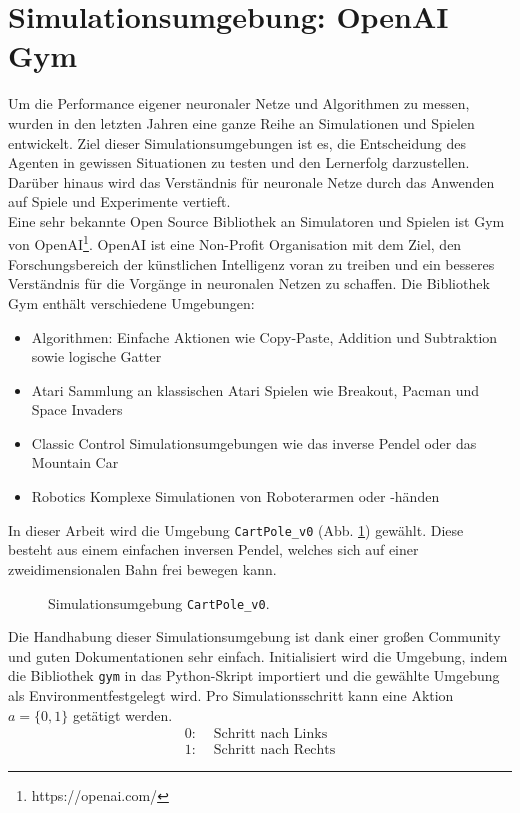 \section{Simulationsumgebung: OpenAI Gym}
\label{sec:imp_sim}
	Um die Performance eigener neuronaler Netze und Algorithmen zu messen, wurden in den letzten Jahren eine ganze Reihe an Simulationen und Spielen entwickelt. Ziel dieser Simulationsumgebungen ist es, die Entscheidung des Agenten in gewissen Situationen zu testen und den Lernerfolg darzustellen. Darüber hinaus wird das Verständnis für neuronale Netze durch das Anwenden auf Spiele und Experimente vertieft.\\
	Eine sehr bekannte Open Source Bibliothek an Simulatoren und Spielen ist Gym von OpenAI\footnote{https://openai.com/}. OpenAI ist eine Non-Profit Organisation mit dem Ziel, den Forschungsbereich der künstlichen Intelligenz voran zu treiben und ein besseres Verständnis für die Vorgänge in neuronalen Netzen zu schaffen. Die Bibliothek Gym enthält verschiedene Umgebungen:
	\begin{itemize}
		\item Algorithmen:
		\subitem Einfache Aktionen wie Copy-Paste, Addition und Subtraktion sowie logische Gatter
		\item Atari
		\subitem Sammlung an klassischen Atari Spielen wie Breakout, Pacman und Space Invaders
		\item Classic Control
		\subitem Simulationsumgebungen wie das inverse Pendel oder das Mountain Car
		\item Robotics
		\subitem Komplexe Simulationen von Roboterarmen oder -händen
	\end{itemize}
	In dieser Arbeit wird die Umgebung \texttt{CartPole\_v0} (Abb. \ref{fig:imp_cartpole}) gewählt. Diese besteht aus einem einfachen inversen Pendel, welches sich auf einer zweidimensionalen Bahn frei bewegen kann.
	\begin{figure}[H] %
		\centering
		\def\svgwidth{12cm}
		
		\caption{Simulationsumgebung \texttt{CartPole\_v0}.}
		\label{fig:imp_cartpole}
	\end{figure}
	Die Handhabung dieser Simulationsumgebung ist dank einer großen Community und guten Dokumentationen sehr einfach. Initialisiert wird die Umgebung, indem die Bibliothek \texttt{gym} in das Python-Skript importiert und die gewählte Umgebung als \glqq Environment\grqq{}festgelegt wird. Pro Simulationsschritt kann eine Aktion $a = \{0,1\}$ getätigt werden.
	\begin{align*}
		0 :& \text{ Schritt nach Links}\\
		1 :& \text{ Schritt nach Rechts}
	\end{align*}
